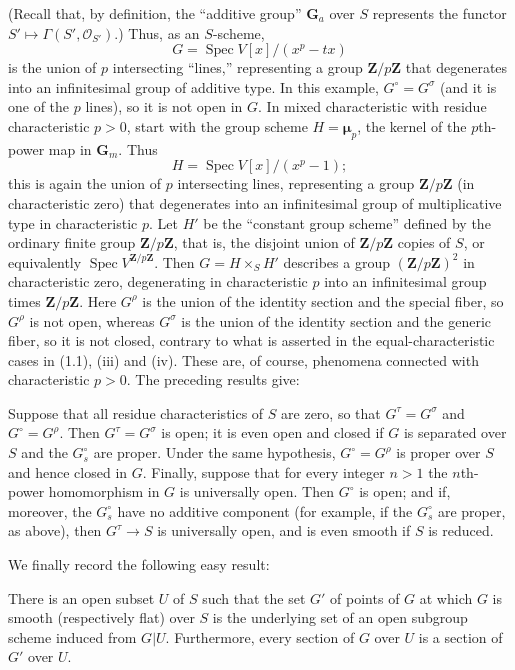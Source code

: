 (Recall that, by definition, the “additive group” $\mathbf G_a$ over $S$
represents the functor $S'\longmapsto\Gamma(S',\mathcal O_{S'})$.) Thus, as an
$S$-scheme,
\[
G=\operatorname{Spec}V[x]/(x^p-tx)
\]
is the union of $p$ intersecting “lines,” representing a group
$\mathbf Z/p\mathbf Z$ that degenerates into an infinitesimal group of additive
type. In this example, $G^\circ=G^\sigma$ (and it is one of the $p$ lines), so
it is not open in $G$. In mixed characteristic with residue characteristic
$p>0$, start with the group scheme $H=\boldsymbol\mu_p$, the kernel of the
$p$th-power map in $\mathbf G_m$. Thus
\[
H=\operatorname{Spec}V[x]/(x^p-1);
\]
this is again the union of $p$ intersecting lines, representing a group
$\mathbf Z/p\mathbf Z$ (in characteristic zero) that degenerates into an
infinitesimal group of multiplicative type in characteristic $p$. Let $H'$ be
the “constant group scheme” defined by the ordinary finite group
$\mathbf Z/p\mathbf Z$, that is, the disjoint union of $\mathbf Z/p\mathbf Z$
copies of $S$, or equivalently $\operatorname{Spec}V^{\mathbf Z/p\mathbf Z}$.
Then $G=H\times_S H'$ describes a group $(\mathbf Z/p\mathbf Z)^2$ in
characteristic zero, degenerating in characteristic $p$ into an infinitesimal
group times $\mathbf Z/p\mathbf Z$. Here $G^\rho$ is the union of the identity
section and the special fiber, so $G^\rho$ is not open, whereas $G^\sigma$ is
the union of the identity section and the generic fiber, so it is not closed,
contrary to what is asserted in the equal-characteristic cases in (1.1), (iii)
and (iv). These are, of course, phenomena connected with characteristic $p>0$.
The preceding results give:

 Suppose that all residue characteristics of $S$ are
zero, so that $G^\tau=G^\sigma$ and $G^\circ=G^\rho$. Then
$G^\tau=G^\sigma$ is open; it is even open and closed if $G$ is separated over
$S$ and the $G_s^\circ$ are proper. Under the same hypothesis,
$G^\circ=G^\rho$ is proper over $S$ and hence closed in $G$. Finally, suppose
that for every integer $n>1$ the $n$th-power homomorphism in $G$ is universally
open. Then $G^\circ$ is open; and if, moreover, the $G_s^\circ$ have no
additive component (for example, if the $G_s^\circ$ are proper, as above),
then $G^\tau\longrightarrow S$ is universally open, and is even smooth if $S$
is reduced.

We finally record the following easy result:

 There is an open subset $U$ of $S$ such that the
set $G'$ of points of $G$ at which $G$ is smooth (respectively flat) over $S$
is the underlying set of an open subgroup scheme induced from $G|U$.
Furthermore, every section of $G$ over $U$ is a section of $G'$ over $U$.

